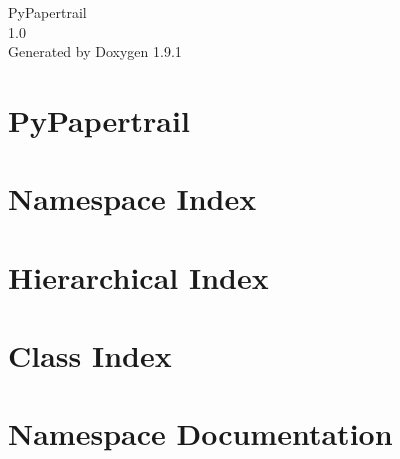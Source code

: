 \let\mypdfximage\pdfximage\def\pdfximage{\immediate\mypdfximage}\documentclass[twoside]{book}
\newcommand{\+}{\discretionary{\mbox{\scriptsize$\hookleftarrow$}}{}{}}
\newcommand{\clearemptydoublepage}{%
  \newpage{\pagestyle{empty}\cleardoublepage}%
}
\begin{document}
\raggedbottom

\hypersetup{pageanchor=false,
             bookmarksnumbered=true,
             pdfencoding=unicode
            }
\begin{titlepage}
\vspace*{7cm}
\begin{center}%
{\Large Py\+Papertrail \\[1ex]\large 1.\+0 }\\
\vspace*{1cm}
{\large Generated by Doxygen 1.9.1}\\
\end{center}
\end{titlepage}
\clearemptydoublepage
{}
\tableofcontents
\clearemptydoublepage
{}
\hypersetup{pageanchor=true}

\chapter{Py\+Papertrail}
\label{md_README}

\chapter{Namespace Index}

\chapter{Hierarchical Index}

\chapter{Class Index}

\chapter{Namespace Documentation}



















\end{document}
